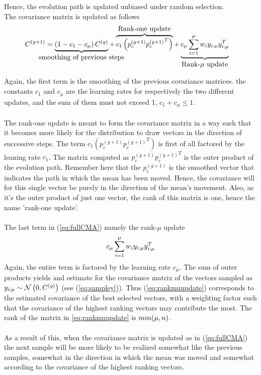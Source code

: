 Hence, the evolution path is updated unbiased under random selection.
\\
The covariance matrix is updated as follows
\begin{align}
C^{(g+1)} &= 
\underbrace{\left( 1 - c_{1} - c_{\offspringNumber} \right)C^{(g)}}_{
\makebox[0pt]{\text{{smoothing of previous steps}}}
} + 
\overbrace{c_{1} \left( p_{c}^{(g+1)} {p_{c}^{(g+1)}}^{T}\right)}^{
\makebox[0pt]{\text{{Rank-one update}}}
} +
\underbrace{c_{\offspringNumber} \sum^{\offspringNumber}_{i = 1} w_{i} y_{i : \offspringNumber} y_{i : \offspringNumber} ^{T}}_{
\makebox[0pt]{\text{{Rank-$\mu$ update}}}
} \label{eq:fullCMA}
\end{align}

Again, the first term is the smoothing of the previous covariance matrices.
the constants $c_1$ and $c_\mu$ are the learning rates for respectively the two
different updates, and the sum of them must not exceed 1, $c_1 + c_\mu \leq 1$.\\
\\
The rank-one update is meant to form the covariance matrix in a way such that 
it becomes more likely for the distribution to draw vectors in the direction of
successive steps. The term $c_{1} \left( p_{c}^{(g+1)} {p_{c}^{(g+1)}}^{T}\right)$
is first of all factored by the leaning rate $c_1$. The matrix computed as 
$p_{c}^{(g+1)} {p_{c}^{(g+1)}}^{T}$ is the outer product of the evolution path. 
Remember here that the $p_{c}^{(g+1)}$ is the smoothed vector that indicates 
the path in which the mean has been moved. Hence, the covariance will for this 
single vector be purely in the direction of the mean's movement. Also, as it's 
the outer product of just one vector, the rank of this matrix is one, hence the
name 'rank-one update'.\\
\\
The last term in (\ref{eq:fullCMA}) namely the rank-$\mu$ update
\begin{align}
c_{\mu} \sum^{\mu}_{i = 1} w_{i} y_{i : \mu} y_{i : \mu} ^{T} \label{eq:rankmuupdate}
\end{align}
Again, the entire term is factored by the learning rate $c_\mu$. The sum
of outer products yields and estimate for the covariance matrix of the vectors
sampled as $y_{i : \mu} \sim \mathcal{N}\left(0, C^{(g)}\right)$ 
(see (\ref{eq:sampley})). Thus (\ref{eq:rankmuupdate}) corresponds to the 
estimated covariance of the best selected vectors, with a weighting factor
such that the covariance of the highest ranking vectors may contribute the most.
The rank of the matrix in \ref{eq:rankmuupdate} is $min(\mu, n)$.\\
\\
As a result of this, when the covariance matrix is updated as in (\ref{eq:fullCMA})
the next sample will be more likely to be realized somewhat like the previous 
samples, somewhat in the direction in which the mean was moved and somewhat 
according to the covariance of the highest ranking vectors.
\\



